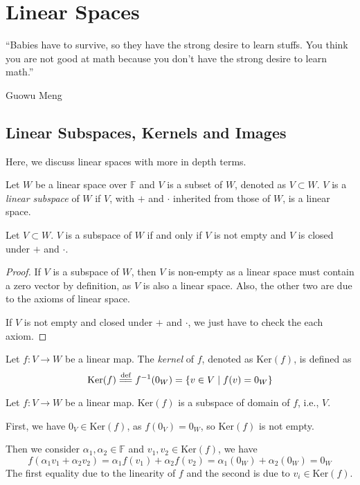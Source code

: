 \documentclass[
	11pt, %
	fleqn, %
	a4paper, %
]{LegrandOrangeBook}
\renewcommand{\ker}[1]{\text{Ker}(#1)} %
\newcommand{\F}{\mathbb{F}} %
\begin{document}
\chapter{Linear Spaces}

\epigraph{``Babies have to survive, so they have the strong desire to learn stuffs. You think you are not good at math because you don't have the strong desire to learn math.''}{Guowu Meng}

\section{Linear Subspaces, Kernels and Images}

Here, we discuss linear spaces with more in depth terms.

\begin{definition}
    Let $W$ be a linear space over $\F$ and $V$ is a subset of $W$, denoted as $V \subset W$. $V$ is a \emph{linear subspace} of $W$ if $V$, with $+$ and $\cdot$ inherited from those of $W$, is a linear space.
\end{definition}

\begin{proposition}
    Let $V \subset W$. $V$ is a subspace of $W$ if and only if $V$ is not empty and $V$ is closed under $+$ and $\cdot$.
\end{proposition}

\begin{proof}
    If $V$ is a subspace of $W$, then $V$ is non-empty as a linear space must contain a zero vector by definition, as $V$ is also a linear space. Also, the other two are due to the axioms of linear space.

    If $V$ is not empty and closed under $+$ and $\cdot$, we just have to check the each axiom.
\end{proof}

\begin{definition}[Kernels]
    Let $f : V \to W$ be a linear map. The \emph{kernel} of $f$, denoted as $\ker f$, is defined as 
    \[
        \ker f \overset{\text{def}}{=\joinrel=} f^{-1}(0_W) = \{ v \in V \mid f(v) = 0_W \}
    \]
\end{definition}

\begin{example}
    Let $f : V \to W$ be a linear map. $\ker f$ is a subspace of domain of $f$, i.e., $V$.
    
    First, we have $0_V \in \ker f$, as $f(0_V) = 0_W$, so $\ker f$ is not empty.

    Then we consider $\alpha_1, \alpha_2 \in \F$ and $v_1, v_2 \in \ker f$, we have
    \[
        f(\alpha_1 v_1 + \alpha_2 v_2) = \alpha_1 f(v_1) + \alpha_2 f(v_2) = \alpha_1 (0_W) + \alpha_2 (0_W) = 0_W
    \]
    The first equality due to the linearity of $f$ and the second is due to $v_i \in \ker f$.
\end{example}
\end{document}
